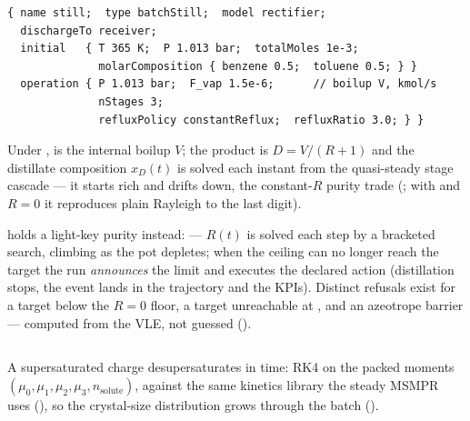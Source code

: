 \documentclass[11pt,a4paper]{article}
\begin{document}
\begin{lstlisting}[language=dict]
{ name still;  type batchStill;  model rectifier;
  dischargeTo receiver;
  initial   { T 365 K;  P 1.013 bar;  totalMoles 1e-3;
              molarComposition { benzene 0.5;  toluene 0.5; } }
  operation { P 1.013 bar;  F_vap 1.5e-6;      // boilup V, kmol/s
              nStages 3;
              refluxPolicy constantReflux;  refluxRatio 3.0; } }
\end{lstlisting}

Under ,  is the internal boilup $V$;
the product is $D = V/(R+1)$ and the distillate composition
$x_D(t)$ is solved each instant from the quasi-steady stage cascade ---
it starts rich and drifts down, the constant-$R$ purity trade
(; with  and
$R = 0$ it reproduces plain Rayleigh to the last digit).

 holds a light-key purity
instead:  --- $R(t)$ is solved each step by a
bracketed search, climbing as the pot depletes; when the ceiling can no
longer reach the target the run \emph{announces} the limit and executes
the declared action (distillation stops, the event lands in the
trajectory and the KPIs).  Distinct refusals exist for a target below
the $R=0$ floor, a target unreachable at \code{refluxMax}, and an
azeotrope barrier --- computed from the VLE, not guessed
().

\subsection{}

A supersaturated charge desupersaturates in time: RK4 on the packed
moments $(\mu_0,\mu_1,\mu_2,\mu_3,n_{\mathrm{solute}})$, against the
same kinetics library the steady MSMPR uses
(), so the crystal-size distribution
grows through the batch (\file{batch05\_crystalliser}).

\subsection{}
\end{document}
